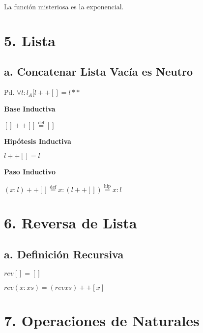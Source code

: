 \documentclass[spanish,]{article}
\begin{document}
La función misteriosa es la exponencial.

\hypertarget{lista}{%
\section{5. Lista}\label{lista}}

\hypertarget{a.-concatenar-lista-vacuxeda-es-neutro}{%
\subsection{a. Concatenar Lista Vacía es
Neutro}\label{a.-concatenar-lista-vacuxeda-es-neutro}}

Pd. \(\forall l: l_A [l ++ [] = l**\)

\textbf{Base Inductiva}

\([] ++ [] \overset{\text{def}}=[]\)

\textbf{Hipótesis Inductiva}

\(l ++ [] = l\)

\textbf{Paso Inductivo}

\((x:l) ++ [] \overset{\text{def}}=x:(l ++ []) \overset{\text{hip}}=x:l\)

\hypertarget{reversa-de-lista}{%
\section{6. Reversa de Lista}\label{reversa-de-lista}}

\hypertarget{a.-definiciuxf3n-recursiva}{%
\subsection{a. Definición Recursiva}\label{a.-definiciuxf3n-recursiva}}

\(rev [] = []\)

\(rev (x:xs) = (rev xs) ++ [x]\)

\hypertarget{operaciones-de-naturales}{%
\section{7. Operaciones de Naturales}\label{operaciones-de-naturales}}
\end{document}
